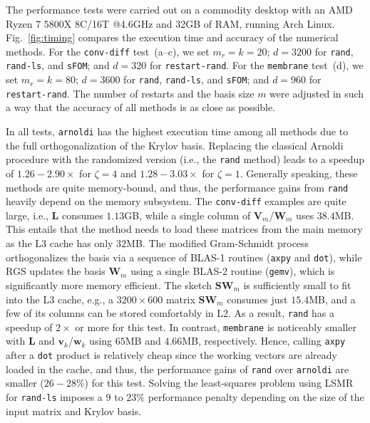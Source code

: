 \documentclass[smallextended]{svjour3}
\renewcommand{\vec}[1]{\mathbf{#1}}
\newcommand{\mat}[1]{\mathbf{#1}}
\begin{document}
The performance tests were carried out on a commodity desktop with an AMD Ryzen 7 5800X 8C/16T @4.6GHz and 32GB of RAM, running Arch Linux. Fig.~\ref{fig:timing} compares the execution time and accuracy of the numerical methods. For the \texttt{conv-diff} test~(a--c), we set $m_r = k = 20$; $d = 3200$ for \texttt{rand}, \texttt{rand-ls}, and \texttt{sFOM}; and $d = 320$ for \texttt{restart-rand}. For the \texttt{membrane} test~(d), we set $m_r = k = 80$; $d = 3600$ for \texttt{rand}, \texttt{rand-ls}, and \texttt{sFOM}; and $d = 960$ for \texttt{restart-rand}. The number of restarts and the basis size $m$ were adjusted in such a way that the accuracy of all methods is as close as possible.

In all tests, \texttt{arnoldi} has the highest execution time among all methods due to the full orthogonalization of the Krylov basis. Replacing the classical Arnoldi procedure with the randomized version (i.e., the \texttt{rand} method) leads to a speedup of $1.26 - 2.90\times$ for $\zeta = 4$ and $1.28 - 3.03\times$ for $\zeta = 1$. Generally speaking, these methods are quite memory-bound, and thus, the performance gains from \texttt{rand} heavily depend on the memory subsystem. The \texttt{conv-diff} examples are quite large, i.e., $\mat{L}$ consumes $1.13$GB, while a single column of $\mat{V}_m$/$\mat{W}_m$ uses $38.4$MB. This entails that the method needs to load these matrices from the main memory as the L3 cache has only $32$MB. The modified Gram-Schmidt process orthogonalizes the basis via a sequence of BLAS-1 routines (\texttt{axpy} and \texttt{dot}), while RGS updates the basis $\mat{W}_m$ using a single BLAS-2 routine (\texttt{gemv}), which is significantly more memory efficient. The sketch $\mat{S W}_m$ is sufficiently small to fit into the L3 cache, e.g., a $3200 \times 600$ matrix $\mat{S W}_m$ consumes just $15.4$MB, and a few of its columns can be stored comfortably in L2. As a result, \texttt{rand} has a speedup of $2\times$ or more for this test. In contrast, \texttt{membrane} is noticeably smaller with $\mat{L}$ and $\vec{v}_k$/$\vec{w}_k$ using $65$MB and $4.66$MB, respectively. Hence, calling \texttt{axpy} after a \texttt{dot} product is relatively cheap since the working vectors are already loaded in the cache, and thus, the performance gains of \texttt{rand} over \texttt{arnoldi} are smaller ($26-28\%$) for this test. Solving the least-squares problem using LSMR for \texttt{rand-ls} imposes a $9$ to $23\%$ performance penalty depending on the size of the input matrix and Krylov basis.
\end{document}

